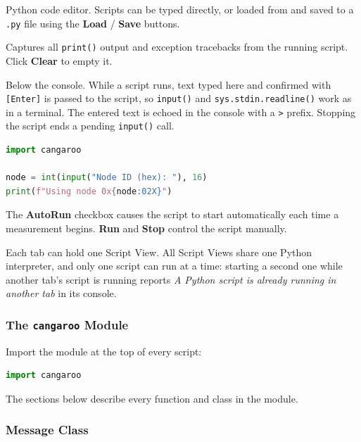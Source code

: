 \documentclass[a4paper,11pt]{article}
\newcommand{\key}[1]{\texttt{\small[#1]}}
\newcommand{\ui}[1]{\textbf{#1}}
\newcommand{\file}[1]{\texttt{#1}}
\begin{document}
\begin{description}[leftmargin=2em, style=nextline]
  \item[Editor (top)] Python code editor. Scripts can be typed directly, or loaded
        from and saved to a \file{.py} file using the \ui{Load} / \ui{Save} buttons.
  \item[Console (bottom)] Captures all \texttt{print()} output and exception
        tracebacks from the running script. Click \ui{Clear} to empty it.
  \item[Input line] Below the console. While a script runs, text typed here and
        confirmed with \key{Enter} is passed to the script, so \texttt{input()} and
        \texttt{sys.stdin.readline()} work as in a terminal. The entered text is
        echoed in the console with a \texttt{>} prefix. Stopping the script ends
        a pending \texttt{input()} call.
\end{description}

\begin{lstlisting}[language=Python, caption={Asking the user for a value}]
import cangaroo

node = int(input("Node ID (hex): "), 16)
print(f"Using node 0x{node:02X}")
\end{lstlisting}

The \ui{AutoRun} checkbox causes the script to start automatically each time a
measurement begins. \ui{Run} and \ui{Stop} control the script manually.

Each tab can hold one Script View. All Script Views share one Python interpreter,
and only one script can run at a time: starting a second one while another tab's
script is running reports \textit{A Python script is already running in another
tab} in its console.

\subsubsection{The \texttt{cangaroo} Module}

Import the module at the top of every script:

\begin{lstlisting}[language=Python]
import cangaroo
\end{lstlisting}

The sections below describe every function and class in the module.

\subsubsection{Message Class}
\end{document}
